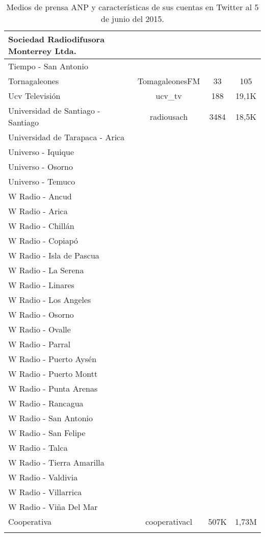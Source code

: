 \begin{center}
\begin{longtable}{| l | c | c | c |}
Sociedad Radiodifusora Monterrey Ltda.	&		&		&		\\ \hline
Tiempo - San Antonio	&		&		&		\\ \hline
Tornagaleones	&	TomagaleonesFM	&	33	&	105	\\ \hline
Ucv Televisión	&	ucv\_tv	&	188	&	19,1K	\\ \hline
Universidad de Santiago - Santiago	&	radiousach	&	3484	&	18,5K	\\ \hline
Universidad de Tarapaca - Arica	&		&		&		\\ \hline
Universo - Iquique	&		&		&		\\ \hline
Universo - Osorno	&		&		&		\\ \hline
Universo - Temuco	&		&		&		\\ \hline
W Radio - Ancud	&		&		&		\\ \hline
W Radio - Arica	&		&		&		\\ \hline
W Radio - Chillán	&		&		&		\\ \hline
W Radio - Copiapó	&		&		&		\\ \hline
W Radio - Isla de Pascua	&		&		&		\\ \hline
W Radio - La Serena	&		&		&		\\ \hline
W Radio - Linares	&		&		&		\\ \hline
W Radio - Los Angeles	&		&		&		\\ \hline
W Radio - Osorno	&		&		&		\\ \hline
W Radio - Ovalle	&		&		&		\\ \hline
W Radio - Parral	&		&		&		\\ \hline
W Radio - Puerto Aysén	&		&		&		\\ \hline
W Radio - Puerto Montt	&		&		&		\\ \hline
W Radio - Punta Arenas	&		&		&		\\ \hline
W Radio - Rancagua	&		&		&		\\ \hline
W Radio - San Antonio	&		&		&		\\ \hline
W Radio - San Felipe	&		&		&		\\ \hline
W Radio - Talca	&		&		&		\\ \hline
W Radio - Tierra Amarilla	&		&		&		\\ \hline
W Radio - Valdivia	&		&		&		\\ \hline
W Radio - Villarrica	&		&		&		\\ \hline
W Radio - Viña Del Mar	&		&		&		\\ \hline
Cooperativa	&	cooperativacl	&	507K	&	1,73M	\\ \hline
\caption {Medios de prensa ANP y características de sus cuentas en Twitter al 5 de junio del 2015.}
	\end{longtable}
\end{center}

